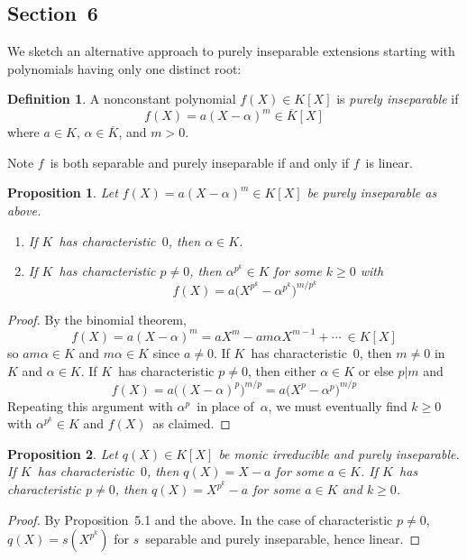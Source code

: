 \documentclass[letterpaper,12pt]{article}
\newcommand{\divides}{|}
\newcommand{\ac}{\overline}
\theoremstyle{definition}
\newtheorem*{defn}{Definition}
\theoremstyle{remark}
\theoremstyle{plain}
\newtheorem*{prop}{Proposition}
\begin{document}
\subsection*{Section~6}
We sketch an alternative approach to purely inseparable extensions starting with polynomials having only one distinct root:
\begin{defn}
A nonconstant polynomial \(f(X)\in K[X]\) is \emph{purely inseparable} if
\[f(X)=a(X-\alpha)^m\in\ac{K}[X]\]
where \(a\in K\), \(\alpha\in\ac{K}\), and \(m>0\).
\end{defn}
\noindent Note \(f\)~is both separable and purely inseparable if and only if \(f\)~is linear.

\begin{prop}
Let \(f(X)=a(X-\alpha)^m\in K[X]\) be purely inseparable as above.
\begin{enumerate}
\item If \(K\)~has characteristic~\(0\), then \(\alpha\in K\).
\item If \(K\)~has characteristic \(p\ne 0\), then \(\alpha^{p^k}\in K\) for some \(k\ge 0\) with
\[f(X)=a\bigl(X^{p^k}-\alpha^{p^k}\bigr)^{m/p^k}\]
\end{enumerate}
\end{prop}
\begin{proof}
By the binomial theorem,
\[f(X)=a(X-\alpha)^m=aX^m-am\alpha X^{m-1}+\cdots\ \in K[X]\]
so \(am\alpha\in K\) and \(m\alpha\in K\) since \(a\ne 0\). If \(K\)~has characteristic~\(0\), then \(m\ne 0\) in~\(K\) and \(\alpha\in K\). If \(K\)~has characteristic \(p\ne 0\), then either \(\alpha\in K\) or else \(p\divides m\) and
\[f(X)=a\bigl((X-\alpha)^p\bigr)^{m/p}=a\bigl(X^p-\alpha^p\bigr)^{m/p}\]
Repeating this argument with \(\alpha^p\)~in place of~\(\alpha\), we must eventually find \(k\ge 0\) with \(\alpha^{p^k}\in K\) and \(f(X)\)~as claimed.
\end{proof}

\begin{prop}
Let \(q(X)\in K[X]\) be monic irreducible and purely inseparable. If \(K\)~has characteristic~\(0\), then \(q(X)=X-a\) for some \(a\in K\). If \(K\)~has characteristic \(p\ne 0\), then \(q(X)=X^{p^k}-a\) for some \(a\in K\) and \(k\ge 0\).
\end{prop}
\begin{proof}
By Proposition~5.1 and the above. In the case of characteristic \(p\ne 0\), \(q(X)=s(X^{p^k})\) for \(s\)~separable and purely inseparable, hence linear.
\end{proof}
\end{document}
